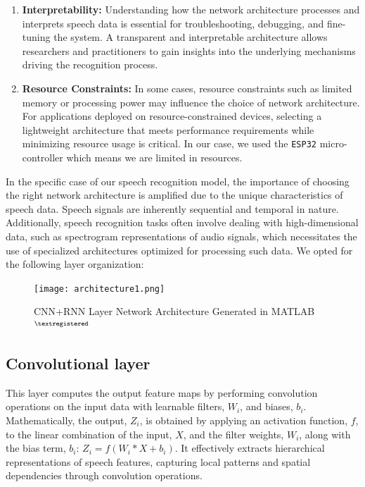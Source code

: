 \documentclass[a4paper]{report}
\begin{document}
{\begin{enumerate}[label=\alph*)]
    \item \textbf{Interpretability:} Understanding how the network architecture processes and interprets speech data is essential for troubleshooting, debugging, and fine-tuning the system. A transparent and interpretable architecture allows researchers and practitioners to gain insights into the underlying mechanisms driving the recognition process.
    
    \item \textbf{Resource Constraints:} In some cases, resource constraints such as limited memory or processing power may influence the choice of network architecture. For applications deployed on resource-constrained devices, selecting a lightweight architecture that meets performance requirements while minimizing resource usage is critical. In our case, we used the \texttt{ESP32} micro-controller which means we are limited in resources.
\end{enumerate}

In the specific case of our speech recognition model, the importance of choosing the right network architecture is amplified due to the unique characteristics of speech data. Speech signals are inherently sequential and temporal in nature. Additionally, speech recognition tasks often involve dealing with high-dimensional data, such as spectrogram representations of audio signals, which necessitates the use of specialized architectures optimized for processing such data. We opted for the following layer organization:

\begin{figure}[H]
    \hspace*{-0.5cm}
    \texttt{[image: architecture1.png]}
    \caption{CNN+RNN Layer Network Architecture Generated in MATLAB$^{\tiny{\textregistered}}$}
    \label{fig:enter-label}
\end{figure}
\subsection{Convolutional layer}
This layer computes the output feature maps by performing convolution operations on the input data with learnable filters, $W_i$, and biases, $b_i$. Mathematically, the output, $Z_i$, is obtained by applying an activation function, $f$, to the linear combination of the input, $X$, and the filter weights, $W_i$, along with the bias term, $b_i$: $Z_i = f(W_i * X + b_i)$. It effectively extracts hierarchical representations of speech features, capturing local patterns and spatial dependencies through convolution operations.

}
\end{document}
